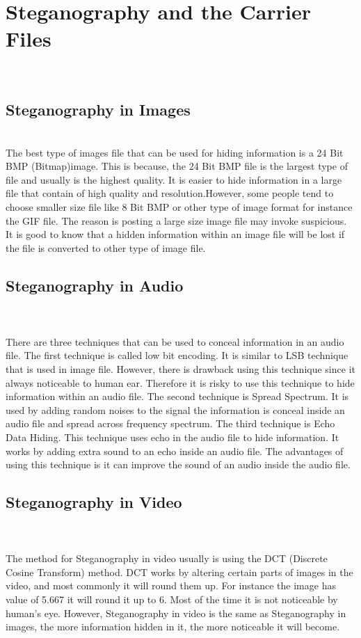 \documentclass[conference, compsoc]{IEEEtran}
\begin{document}
\section{Steganography and the Carrier Files}
\\
\subsection{Steganography in Images}
\\
The best type of images file that can be used for hiding information is a 24 Bit BMP (Bitmap)image. This is because, the 24 Bit BMP file is the largest type of file and usually is the highest quality. It is easier to hide information in a large file that contain of high quality and resolution.However, some people tend to choose smaller size file like 8 Bit BMP or other type of image format for instance the GIF file. The reason is posting a large size image file may invoke suspicious. It is good to know that a hidden information within an image file will be lost if the file is converted to other type of image file.
\\
\subsection{Steganography in Audio}
\\
\\
There are three techniques that can be used to conceal information in an audio file. The first technique is called low bit encoding. It is similar to LSB technique that is used in image file. However, there is drawback using this technique since it always noticeable to human ear. Therefore it is risky to use this technique to hide information within an audio file. The second technique is Spread Spectrum. It is used by adding random noises to the signal the information is conceal inside an audio file and spread across frequency spectrum. The third technique is Echo Data Hiding. This technique uses echo in the audio file to hide information. It works by adding extra sound to an echo inside an audio file. The advantages of using this technique is it can improve the sound of an audio inside the audio file.
\\
\subsection{Steganography in Video}
\\
\\
The method for Steganography in video usually is using the DCT (Discrete Cosine Transform) method. DCT works by altering certain parts of images in the video, and most commonly it will round them up. For instance the image has value of 5.667 it will round it up to 6. Most of the time it is not noticeable by human's eye. However, Steganography in video is the same as Steganography in images, the more information hidden in it, the more noticeable it will become.
\\
\end{document}

